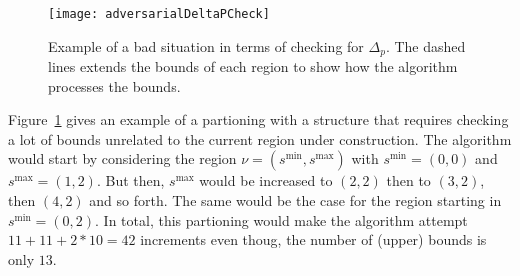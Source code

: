 \begin{figure}[htpb]
    \centering
    \texttt{[image: adversarialDeltaPCheck]}
    \caption{%
        Example of a bad situation in terms of checking for $\Delta_{p}$. The
        dashed lines extends the bounds of each region to show how the algorithm
        processes the bounds.
    }\label{fig:adversarialDeltaPCheck}
\end{figure}

Figure~\ref{fig:adversarialDeltaPCheck} gives an example of a partioning with a
structure that requires checking a lot of bounds unrelated to the current region
under construction. The algorithm would start by considering the region $\nu =
(s^{\min}, s^{\max})$ with $s^{\min} = (0,0)$ and $s^{\max} = (1,2)$. But then,
$s^{\max}$ would be increased to $(2,2)$ then to $(3,2)$, then $(4,2)$ and so
forth. The same would be the case for the region starting in $s^{\min} = (0,2)$.
In total, this partioning would make the algorithm attempt $11 + 11 + 2*10 = 42$
increments even thoug, the number of (upper) bounds is only $13$.






